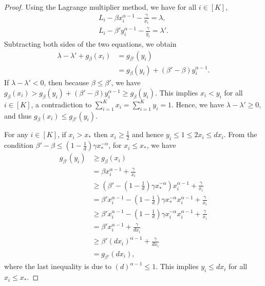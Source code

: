 \begin{proof}
    Using the Lagrange multiplier method, we have for all $i \in [K]$,
    \begin{align}
        L_i - \beta x_i^{\alpha - 1} - \frac{\gamma}{x_i} = \lambda, \\
        L_i - \beta' y_i^{\alpha - 1} - \frac{\gamma}{y_i} = \lambda'.
    \end{align}
    Subtracting both sides of the two equations, we obtain 
    \begin{align*}
        \lambda - \lambda' + g_{\beta}(x_i) &= g_{\beta'}(y_i)\\
        &= g_{\beta}(y_i) + (\beta' - \beta)y_i^{\alpha - 1}.
    \end{align*}
    If $\lambda - \lambda' < 0$, then because $\beta \leq \beta'$, we have $g_{\beta}(x_i) > g_{\beta}(y_i) + (\beta' - \beta)y_i^{\alpha - 1} \geq g_{\beta}(y_i)$. 
    This implies $x_i < y_i$ for all $i \in [K]$, a contradiction to $\sum_{i=1}^K x_i = \sum_{i=1}^K y_i = 1$. Hence, we have $\lambda - \lambda' \geq 0$, and thus $g_\beta(x_i) \leq g_{\beta'}(y_i)$.
    
    For any $i \in [K]$, if $x_i > x_*$ then $x_i \geq \frac{1}{2}$ and hence $y_i \leq 1 \leq 2x_i \leq dx_i$. From the condition $\beta' - \beta \leq (1 - \frac{1}{d})\gamma x_*^{-\alpha}$, for $x_i \leq x_*$, we have 
      \begin{align*}
        g_{\beta'}(y_i) &\geq g_\beta(x_i) \\
        &= \beta x_i^{\alpha-1} + \frac{\gamma}{x_i} \\
        &\geq (\beta' - (1 - \frac{1}{d})\gamma x_*^{-\alpha})x_i^{\alpha - 1} + \frac{\gamma}{x_i} \\
        &= \beta' x_i^{\alpha - 1} - (1 - \frac{1}{d})\gamma x_*^{-\alpha}x_i^{\alpha - 1} + \frac{\gamma}{x_i} \\
        &\geq \beta' x_i^{\alpha - 1} - (1 - \frac{1}{d})\gamma x_i^{-\alpha}x_i^{\alpha - 1} + \frac{\gamma}{x_i} \\
        &= \beta' x_i^{\alpha - 1} + \frac{\gamma}{dx_i} \\
        &\geq \beta' (d x_i)^{\alpha - 1}+ \frac{\gamma}{d x_i} \\
        &= g_{\beta'}(d x_i),
      \end{align*}
      where the last inequality is due to $(d)^{\alpha - 1} \leq 1$.
      This implies $y_i \leq dx_i$ for all $x_i \leq x_*$.
\end{proof}

